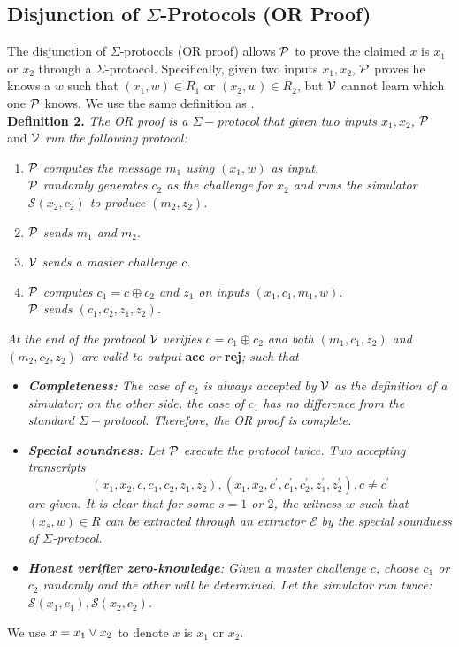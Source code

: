 \subsection{Disjunction of $\Sigma$-Protocols (OR Proof)}
The disjunction of $\Sigma$-protocols (OR proof) allows $\mathcal{P}$ to prove the claimed $x$ is $x_1$ or $x_2$ through a $\Sigma$-protocol. Specifically, given two inputs $x_1,x_2$, $\mathcal{P}$ proves he knows a $w$ such that $(x_1,w)\in{R_1}$ or $(x_2,w)\in{R_2}$, but $\mathcal{V}$ cannot learn which one $\mathcal{P}$ knows. We use the same definition as \cite{damgard10}. \\
\textbf{Definition 2.} \textit{The OR proof is a $\Sigma-$protocol that given two inputs $x_1,x_2$,} $\mathcal{P}$ and $\mathcal{V}$ \textit{run the following protocol:}
\begin{enumerate}
    \item $\mathcal{P}$ \textit{computes the message $m_1$ using $(x_1,w)$ as input.} \\
    $\mathcal{P}$ \textit{randomly generates $c_2$ as the challenge for $x_2$ and runs the simulator $\mathcal{S}(x_2,c_2)$ to produce $(m_2,z_2)$.}
    \item $\mathcal{P}$ \textit{sends $m_1$ and $m_2$.}
    \item $\mathcal{V}$ \textit{sends a master challenge $c$.}
    \item $\mathcal{P}$ \textit{computes $c_1=c\oplus{c_2}$ and $z_1$ on inputs $(x_1,c_1,m_1,w)$.} \\
    $\mathcal{P}$ \textit{sends $(c_1,c_2,z_1,z_2)$.}
\end{enumerate}
\textit{At the end of the protocol} $\mathcal{V}$ \textit{verifies $c=c_1\oplus{c_2}$ and both $(m_1,c_1,z_2)$ and $(m_2,c_2,z_2)$ are valid to output} \textbf{acc} \textit{or} \textbf{rej}\textit{; such that}
\begin{itemize}
    \item \textit{\textbf{Completeness:} The case of $c_2$ is always accepted by} $\mathcal{V}$ \textit{as the definition of a simulator; on the other side, the case of $c_1$ has no difference from the standard $\Sigma-$protocol. Therefore, the OR proof is complete.}
    \item \textit{\textbf{Special soundness:} Let} $\mathcal{P}$ \textit{execute the protocol twice. Two accepting transcripts} 
    \[ (x_1,x_2,c,c_1,c_2,z_1,z_2),(x_1,x_2,c^\prime,c_1^\prime,c_2^\prime,z_1^\prime,z_2^\prime),c\ne{c^\prime} \] 
    \textit{are given. It is clear that for some $s=1$ or $2$, the witness $w$ such that $(x_s,w)\in{R}$ can be extracted through an extractor $\mathcal{E}$ by the special soundness of $\Sigma$-protocol.}
    \item \textit{\textbf{Honest verifier zero-knowledge}: Given a master challenge $c$, choose $c_1$ or $c_2$ randomly and the other will be determined. Let the simulator run twice: $\mathcal{S}(x_1,c_1),\mathcal{S}(x_2,c_2)$. }
\end{itemize}
We use $x={x_1\lor{x_2}}$ to denote $x$ is $x_1$ or $x_2$.

